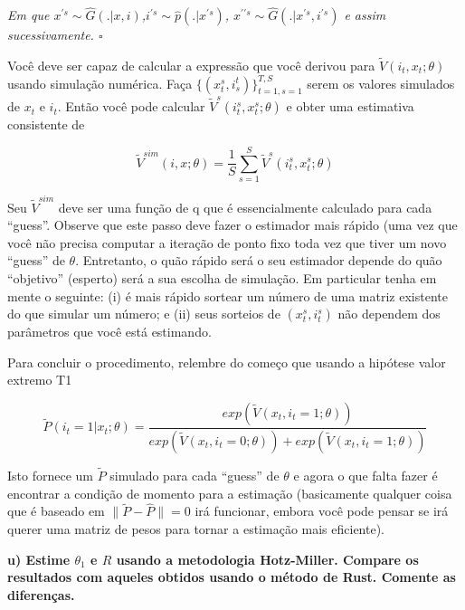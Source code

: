 \documentclass[12pt,a4paper]{article}
\begin{document}
\emph{Em que
\(x^{\prime s} \sim \hat{G}(.|x,i)\),\(i^{\prime s} \sim \hat{p}(.|x^{\prime s})\),
\(x^{\prime \prime s} \sim \hat{G}(.|x^{\prime s},i^{\prime s})\) e
assim sucessivamente. \(\square\)}

Você deve ser capaz de calcular a expressão que você derivou para
\(\tilde{V}(i_t,x_t;\theta)\) usando simulação numérica. Faça
\(\{(x_t^s,i_s^t)\}_{t=1,s=1}^{T,S}\) serem os valores simulados de
\(x_t\) e \(i_t\). Então você pode calcular
\(\tilde{V}^s(i_t^s,x_t^s;\theta)\) e obter uma estimativa consistente
de

\[
\tilde{V}^{sim}(i,x;\theta)=\frac{1}{S}\sum_{s=1}^S \tilde{V}^s(i_t^s,x_t^s;\theta)
\]

Seu \(\tilde{V}^{sim}\) deve ser uma função de q que é essencialmente
calculado para cada ``guess''. Observe que este passo deve fazer o
estimador mais rápido (uma vez que você não precisa computar a iteração
de ponto fixo toda vez que tiver um novo ``guess'' de \(\theta\).
Entretanto, o quão rápido será o seu estimador depende do quão
``objetivo'' (esperto) será a sua escolha de simulação. Em particular
tenha em mente o seguinte: (i) é mais rápido sortear um número de uma
matriz existente do que simular um número; e (ii) seus sorteios de
\((x_t^s , i_t^s )\) não dependem dos parâmetros que você está
estimando.

Para concluir o procedimento, relembre do começo que usando a hipótese
valor extremo T1

\[
\tilde{P}(i_t=1|x_t;\theta)=\frac{exp(\tilde{V}(x_t,i_t=1;\theta))}{exp(\tilde{V}(x_t,i_t=0;\theta))+exp(\tilde{V}(x_t,i_t=1;\theta))}
\]

Isto fornece um \(\tilde{P}\) simulado para cada ``guess'' de \(\theta\)
e agora o que falta fazer é encontrar a condição de momento para a
estimação (basicamente qualquer coisa que é baseado em
\(\| \tilde{P} - \hat{P} \| = 0\) irá funcionar, embora você pode pensar
se irá querer uma matriz de pesos para tornar a estimação mais
eficiente).

\textbf{u) Estime \(\theta_1\) e \(R\) usando a metodologia Hotz-Miller.
Compare os resultados com aqueles obtidos usando o método de Rust.
Comente as diferenças.}
\end{document}
